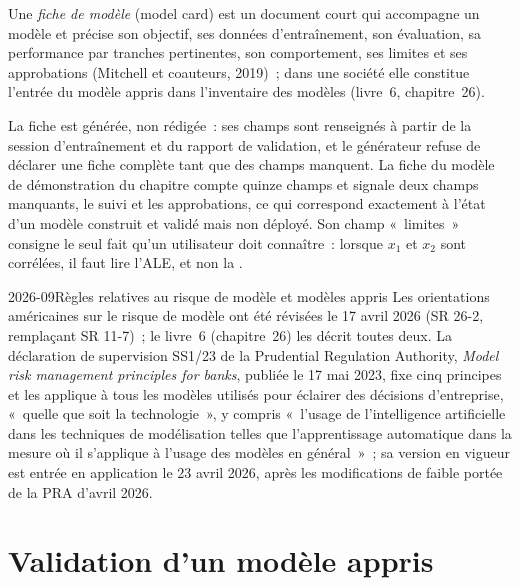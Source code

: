 \begin{definition}\label{def:ml:interpretability-and-model-governance:card}
Une \emph{fiche de modèle} (model card) est un document court qui accompagne un modèle et précise son objectif, ses données
d'entraînement, son évaluation, sa performance par tranches pertinentes, son comportement, ses limites et ses approbations (Mitchell et coauteurs, 2019)~; dans une société
elle constitue l'entrée du modèle appris dans l'inventaire des modèles (livre~6, chapitre~26).
\end{definition}

La fiche est générée, non rédigée~: ses champs sont renseignés à partir de la session d'entraînement et du rapport de validation, et le générateur
refuse de déclarer une fiche complète tant que des champs manquent. La fiche du modèle de démonstration du chapitre compte quinze champs et
signale deux champs manquants, le suivi et les approbations, ce qui correspond exactement à l'état d'un modèle construit et validé mais non
déployé. Son champ «~limites~» consigne le seul fait qu'un utilisateur doit connaître~: lorsque $x_1$ et $x_2$ sont corrélées, il faut lire l'ALE, et non la
.

\begin{dated}{2026-09}{Règles relatives au risque de modèle et modèles appris}\label{dat:ml:interpretability-and-model-governance:rules}
Les orientations américaines sur le risque de modèle ont été révisées le 17 avril 2026 (SR 26-2, remplaçant SR 11-7)~; le livre~6 (chapitre~26)
les décrit toutes deux. La déclaration de supervision SS1/23 de la Prudential Regulation Authority, \emph{Model risk management principles for
banks}, publiée le 17 mai 2023, fixe cinq principes et les applique à tous les modèles utilisés pour éclairer des décisions d'entreprise,
«~quelle que soit la technologie~», y compris «~l'usage de l'intelligence artificielle dans les techniques de modélisation telles que l'apprentissage automatique
dans la mesure où il s'applique à l'usage des modèles en général~»~; sa version en vigueur est entrée en application le 23 avril 2026,
après les modifications de faible portée de la PRA d'avril 2026.
\end{dated}

\section{Validation d'un modèle appris}

